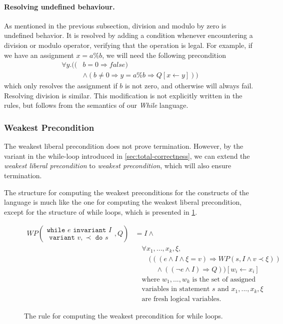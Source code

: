 \paragraph{Resolving undefined behaviour.}
As mentioned in the previous subsection, division and modulo by zero is undefined behavior.
It is resolved by adding a condition whenever encountering a division or modulo operator, verifying that the operation is legal.
For example, if we have an assignment $x = a \% b$, we will need the following precondition
\begin{align*}
\forall y . ( (&b = 0 \Rightarrow false) \\
                &\land (b \neq 0 \Rightarrow y = a \% b \Rightarrow Q[x \leftarrow y]))
\end{align*}
which only resolves the assignment if $b$ is not zero, and otherwise will always fail. Resolving division is similar.
This modification is not explicitly written in the rules, but follows from the semantics of our \textit{While} language.

\subsubsection{Weakest Precondition}
The weakest liberal precondition does not prove termination. However, by the variant in the while-loop introduced in \cref{sec:total-correctness}, we can extend the \textit{weakest liberal precondition} to \textit{weakest precondition}, which will also ensure termination.

The structure for computing the weakest preconditions for the constructs of the language is much like the one for computing the weakest liberal precondition, except for the structure of while loops, which is presented in \cref{fig:wp}.

\begin{figure}[h!]
\begin{align*}
WP\left(
    \begin{array}{c}
    \texttt{while } e \texttt{ invariant } I \\
    \texttt{ variant } v, \prec \texttt{ do } s
    \end{array}
, Q \right) 
&= 
    I \land \label{eq:wpwhile} \\
&\quad \forall x_1, ..., x_k, \xi, \\
&\quad \quad (((e \land I \land \xi = v) \Rightarrow WP(s, I \land v \prec \xi)) \\
&\quad \quad \quad \land ((\neg e \land I) \Rightarrow Q)) [w_i \leftarrow x_i] \\
&\quad \text{where } w_1, ..., w_k \text{ is the set of assigned} \\
&\quad \text{variables in statement } s \text{ and } x_1, ..., x_k, \xi \\
&\quad \text{are fresh logical variables.}
\end{align*}
\caption{The rule for computing the weakest precondition for while loops.}
\label{fig:wp}
\end{figure}

